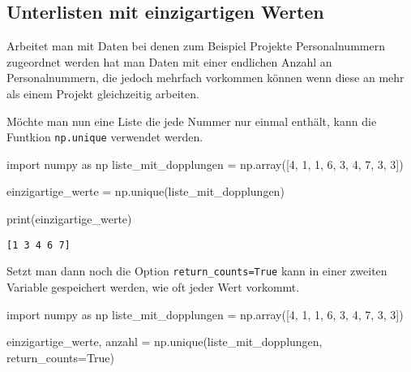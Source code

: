 \documentclass[
  letterpaper,
  DIV=11,
  numbers=noendperiod]{scrreprt}
\newenvironment{Shaded}{\begin{snugshade}}{\end{snugshade}}
\newcommand{\BuiltInTok}[1]{\textcolor[rgb]{0.00,0.23,0.31}{#1}}
\newcommand{\DecValTok}[1]{\textcolor[rgb]{0.68,0.00,0.00}{#1}}
\newcommand{\ImportTok}[1]{\textcolor[rgb]{0.00,0.46,0.62}{#1}}
\newcommand{\NormalTok}[1]{\textcolor[rgb]{0.00,0.23,0.31}{#1}}
\newcommand{\OperatorTok}[1]{\textcolor[rgb]{0.37,0.37,0.37}{#1}}
\newcommand{\VariableTok}[1]{\textcolor[rgb]{0.07,0.07,0.07}{#1}}
\begin{document}
\begin{tcolorbox}
\section{Unterlisten mit einzigartigen
Werten}\label{unterlisten-mit-einzigartigen-werten}

Arbeitet man mit Daten bei denen zum Beispiel Projekte Personalnummern
zugeordnet werden hat man Daten mit einer endlichen Anzahl an
Personalnummern, die jedoch mehrfach vorkommen können wenn diese an mehr
als einem Projekt gleichzeitig arbeiten.

Möchte man nun eine Liste die jede Nummer nur einmal enthält, kann die
Funtkion \texttt{np.unique} verwendet werden.

\begin{Shaded}
\begin{Highlighting}[]
\ImportTok{import}\NormalTok{ numpy }\ImportTok{as}\NormalTok{ np}
\NormalTok{liste\_mit\_dopplungen }\OperatorTok{=}\NormalTok{ np.array([}\DecValTok{4}\NormalTok{, }\DecValTok{1}\NormalTok{, }\DecValTok{1}\NormalTok{, }\DecValTok{6}\NormalTok{, }\DecValTok{3}\NormalTok{, }\DecValTok{4}\NormalTok{, }\DecValTok{7}\NormalTok{, }\DecValTok{3}\NormalTok{, }\DecValTok{3}\NormalTok{])}

\NormalTok{einzigartige\_werte }\OperatorTok{=}\NormalTok{ np.unique(liste\_mit\_dopplungen)}

\BuiltInTok{print}\NormalTok{(einzigartige\_werte)}
\end{Highlighting}
\end{Shaded}

\begin{verbatim}
[1 3 4 6 7]
\end{verbatim}

Setzt man dann noch die Option \texttt{return\_counts=True} kann in
einer zweiten Variable gespeichert werden, wie oft jeder Wert vorkommt.

\begin{Shaded}
\begin{Highlighting}[]
\ImportTok{import}\NormalTok{ numpy }\ImportTok{as}\NormalTok{ np}
\NormalTok{liste\_mit\_dopplungen }\OperatorTok{=}\NormalTok{ np.array([}\DecValTok{4}\NormalTok{, }\DecValTok{1}\NormalTok{, }\DecValTok{1}\NormalTok{, }\DecValTok{6}\NormalTok{, }\DecValTok{3}\NormalTok{, }\DecValTok{4}\NormalTok{, }\DecValTok{7}\NormalTok{, }\DecValTok{3}\NormalTok{, }\DecValTok{3}\NormalTok{])}

\NormalTok{einzigartige\_werte, anzahl }\OperatorTok{=}\NormalTok{ np.unique(liste\_mit\_dopplungen, return\_counts}\OperatorTok{=}\VariableTok{True}\NormalTok{)}


\end{Highlighting}
\end{Shaded}
\end{tcolorbox}
\end{document}
